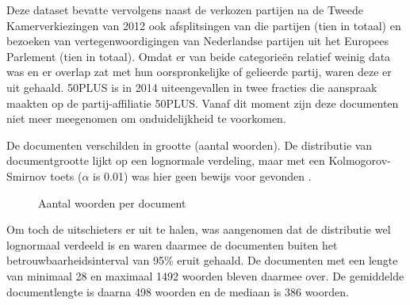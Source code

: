 Deze dataset bevatte vervolgens naast de verkozen partijen na de Tweede Kamerverkiezingen van 2012 ook afsplitsingen van die partijen (tien in totaal) en bezoeken van vertegenwoordigingen van Nederlandse partijen uit het Europees Parlement (tien in totaal). Omdat er van beide categorieën relatief weinig data was en er overlap zat met hun oorspronkelijke of gelieerde partij, waren deze er uit gehaald. 50PLUS is in 2014 \cite{50PLUSNRC} uiteengevallen in twee fracties die aanspraak maakten op de partij-affiliatie 50PLUS. Vanaf dit moment zijn deze documenten niet meer meegenomen om onduidelijkheid te voorkomen.\par

De documenten verschilden in grootte (aantal woorden). De distributie van documentgrootte lijkt op een lognormale verdeling, maar met een Kolmogorov-Smirnov toets ($\alpha$ is 0.01) was hier geen bewijs voor gevonden \cite{Scipy}.

\begin{figure}[H]
    \centering
    \hspace*{-1in}
    \caption{Aantal woorden per document}%
    \label{fig:example}%
\end{figure}
Om toch de uitschieters er uit te halen, was aangenomen dat de distributie wel lognormaal verdeeld is en waren daarmee de documenten buiten het betrouwbaarheidsinterval van 95\% eruit gehaald. De documenten met een lengte van minimaal 28 en maximaal 1492 woorden bleven daarmee over. De gemiddelde documentlengte is daarna 498 woorden en de mediaan is 386 woorden.\par


